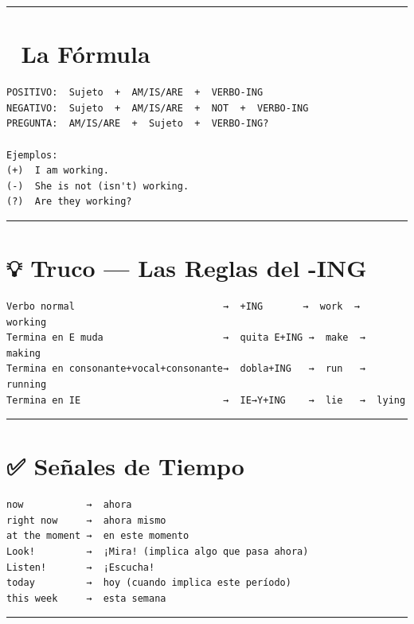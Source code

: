 \documentclass[
  spanish,
  letterpaper,
]{scrbook}
\begin{document}
\begin{center}\rule{0.5\linewidth}{0.5pt}\end{center}

\section{📐 La Fórmula}\label{la-fuxf3rmula}

\begin{verbatim}
POSITIVO:  Sujeto  +  AM/IS/ARE  +  VERBO-ING
NEGATIVO:  Sujeto  +  AM/IS/ARE  +  NOT  +  VERBO-ING
PREGUNTA:  AM/IS/ARE  +  Sujeto  +  VERBO-ING?

Ejemplos:
(+)  I am working.
(-)  She is not (isn't) working.
(?)  Are they working?
\end{verbatim}

\begin{center}\rule{0.5\linewidth}{0.5pt}\end{center}

\section{💡 Truco --- Las Reglas del
-ING}\label{truco-las-reglas-del--ing}

\begin{verbatim}
Verbo normal                          →  +ING       →  work  →  working
Termina en E muda                     →  quita E+ING →  make  →  making
Termina en consonante+vocal+consonante→  dobla+ING   →  run   →  running
Termina en IE                         →  IE→Y+ING    →  lie   →  lying
\end{verbatim}

\begin{center}\rule{0.5\linewidth}{0.5pt}\end{center}

\section{✅ Señales de Tiempo}\label{seuxf1ales-de-tiempo}

\begin{verbatim}
now           →  ahora
right now     →  ahora mismo
at the moment →  en este momento
Look!         →  ¡Mira! (implica algo que pasa ahora)
Listen!       →  ¡Escucha!
today         →  hoy (cuando implica este período)
this week     →  esta semana
\end{verbatim}

\begin{center}\rule{0.5\linewidth}{0.5pt}\end{center}
\end{document}
